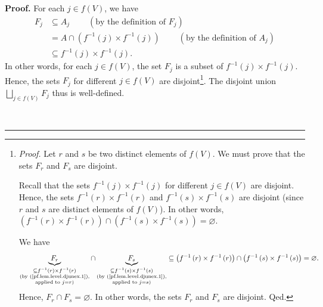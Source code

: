 \documentclass[numbers=enddot,12pt,final,onecolumn,notitlepage]{scrartcl}%
\numberwithin{exer}{section}
\theoremstyle{definition}
\newenvironment{proof}[1][Proof]{\noindent\textbf{#1.} }{\ \rule{0.5em}{0.5em}}
\let\sqcupnonlimits\bigsqcup
\renewcommand{\bigsqcup}{\sqcupnonlimits\limits}
\newenvironment{verlong}{}{}
\begin{document}
\begin{verlong}
\begin{proof}
For each $j\in f\left(  V\right)  $, we have%
\begin{align}
F_{j}  &  \subseteq A_{j}\ \ \ \ \ \ \ \ \ \ \left(  \text{by the definition
of }F_{j}\right) \nonumber\\
&  =A\cap\left(  f^{-1}\left(  j\right)  \times f^{-1}\left(  j\right)
\right)  \ \ \ \ \ \ \ \ \ \ \left(  \text{by the definition of }A_{j}\right)
\nonumber\\
&  \subseteq f^{-1}\left(  j\right)  \times f^{-1}\left(  j\right)  .
\label{pf.lem.level.djunex.1}%
\end{align}
In other words, for each $j\in f\left(  V\right)  $, the set $F_{j}$ is a
subset of $f^{-1}\left(  j\right)  \times f^{-1}\left(  j\right)  $. Hence,
the sets $F_{j}$ for different $j\in f\left(  V\right)  $ are
disjoint\footnote{\textit{Proof.} Let $r$ and $s$ be two distinct elements of
$f\left(  V\right)  $. We must prove that the sets $F_{r}$ and $F_{s}$ are
disjoint.
\par
Recall that the sets $f^{-1}\left(  j\right)  \times f^{-1}\left(  j\right)  $
for different $j\in f\left(  V\right)  $ are disjoint. Hence, the sets
$f^{-1}\left(  r\right)  \times f^{-1}\left(  r\right)  $ and $f^{-1}\left(
s\right)  \times f^{-1}\left(  s\right)  $ are disjoint (since $r$ and $s$ are
distinct elements of $f\left(  V\right)  $). In other words, $\left(
f^{-1}\left(  r\right)  \times f^{-1}\left(  r\right)  \right)  \cap\left(
f^{-1}\left(  s\right)  \times f^{-1}\left(  s\right)  \right)  =\varnothing$.
\par
We have%
\[
\underbrace{F_{r}}_{\substack{\subseteq f^{-1}\left(  r\right)  \times
f^{-1}\left(  r\right)  \\\text{(by (\ref{pf.lem.level.djunex.1}%
),}\\\text{applied to }j=r\text{)}}}\cap\underbrace{F_{s}}%
_{\substack{\subseteq f^{-1}\left(  s\right)  \times f^{-1}\left(  s\right)
\\\text{(by (\ref{pf.lem.level.djunex.1}),}\\\text{applied to }j=s\text{)}%
}}\subseteq\left(  f^{-1}\left(  r\right)  \times f^{-1}\left(  r\right)
\right)  \cap\left(  f^{-1}\left(  s\right)  \times f^{-1}\left(  s\right)
\right)  =\varnothing.
\]
Hence, $F_{r}\cap F_{s}=\varnothing$. In other words, the sets $F_{r}$ and
$F_{s}$ are disjoint. Qed.}. The disjoint union $\bigsqcup_{j\in f\left(
V\right)  }F_{j}$ thus is well-defined.


\end{proof}
\end{verlong}
\end{document}
